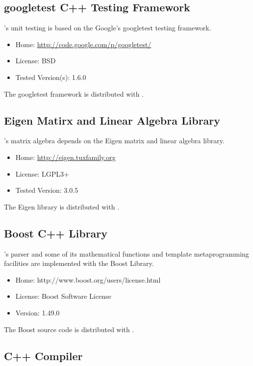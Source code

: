 \subsection{googletest C++ Testing Framework}

\Stan's unit testing is based on the Google's googletest \Cpp testing
framework.  
%
\begin{itemize}
\item
Home: \url{http://code.google.com/p/googletest/}
\item
License: BSD
\item
Tested Version(s): 1.6.0
\end{itemize}
%
The googletest framework is distributed with \Stan.

\subsection{Eigen Matirx and Linear Algebra Library}

\Stan's matrix algebra depends on the Eigen \Cpp matrix and linear
algebra library.  
%
\begin{itemize}
\item Home: \url{http://eigen.tuxfamily.org}
\item License: LGPL3+
\item Tested Version: 3.0.5
\end{itemize}
%
The Eigen library is distributed with \Stan.

\subsection{Boost C++ Library}

\Stan's parser and some of its mathematical functions and 
template metaprogramming facilities are implemented with the Boost
\Cpp Library.  
%
\begin{itemize}
\item Home: http://www.boost.org/users/license.html
\item License: Boost Software License
\item Version: 1.49.0
\end{itemize}
%
The Boost source code is distributed with \Stan.

\subsection{C++ Compiler}

